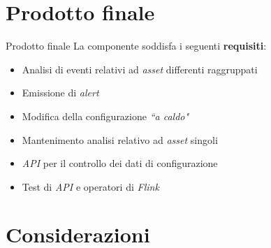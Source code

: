 \documentclass{beamer}
\begin{document}
	
	
	\section{Prodotto finale}

	\begin{frame}{Prodotto finale}
		La componente soddisfa i seguenti \textbf{requisiti}:
		\vspace{.2em}
		\begin{itemize}
			\item Analisi di eventi relativi ad \textit{asset} differenti raggruppati \vspace{.5em}
			\item Emissione di \textit{alert} \vspace{.5em}
			\item Modifica della configurazione \textit{``a caldo"} \vspace{.5em}
			\item Mantenimento analisi relativo ad \textit{asset} singoli \vspace{.5em}
			\item \textit{API} per il controllo dei dati di configurazione \vspace{.5em}
			\item Test di \textit{API} e operatori di \textit{Flink} \vspace{.5em}
		\end{itemize}
	\end{frame}
	
	\section{Considerazioni}
\end{document}
